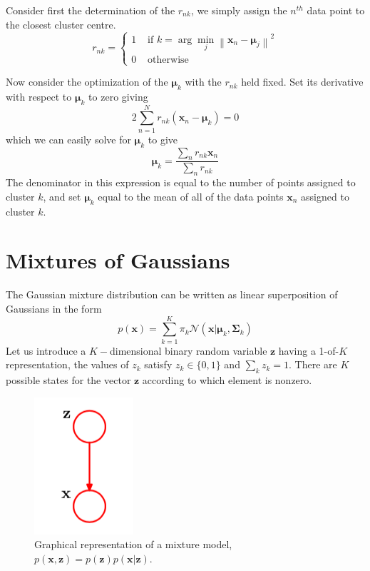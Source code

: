 \documentclass[5p,sort&compress]{elsarticle}
\begin{document}
Consider first the determination of the $r_{nk}$, we simply assign the $n^{th}$ data point to the closest cluster centre.
\begin{equation}
r_{n k}=\left\{\begin{array}{ll}{1} & {\text { if } k=\arg \min _{j}\left\|\mathbf{x}_{n}-\boldsymbol{\mu}_{j}\right\|^{2}} \\ {0} & {\text { otherwise }}\end{array}\right.
\end{equation}

Now consider the optimization of the $\boldsymbol{\mu}_k$ with the $r_{nk}$ held fixed. Set its derivative with respect to $\boldsymbol{\mu}_k$ to zero giving
\begin{equation}
2 \sum_{n=1}^{N} r_{n k}\left(\mathbf{x}_{n}-\boldsymbol{\mu}_{k}\right)=0
\end{equation}
which we can easily solve for $\boldsymbol{\mu}_k$ to give
\begin{equation}
\boldsymbol{\mu}_{k}=\frac{\sum_{n} r_{n k} \mathbf{x}_{n}}{\sum_{n} r_{n k}}
\end{equation}
The denominator in this expression is equal to the number of points assigned to cluster $k$, and set $\boldsymbol{\mu}_k$ equal to the mean of all of the data points $\mathbf{x}_n$ assigned to cluster $k$.



\section{Mixtures of Gaussians}

The Gaussian mixture distribution can be written as linear superposition of Gaussians in the form
\begin{equation}
p(\mathbf{x})=\sum_{k=1}^{K} \pi_{k} \mathcal{N}\left(\mathbf{x} | \boldsymbol{\mu}_{k}, \mathbf{\Sigma}_{k}\right)
\end{equation}
Let us introduce a $K-$dimensional binary random variable $\mathbf{z}$ having a 1-of-$K$ representation, the values of $z_k$ satisfy $z_k \in \{0,1\}$ and $\sum_k z_k = 1$. There are $K$ possible states for the vector $\mathbf{z}$ according to which element is nonzero.

\begin{figure}[ht]
     \centering
     \includegraphics[width = 0.3\linewidth]{figure/figure9_4.png}
     \caption{Graphical representation of a mixture model, $p(\mathbf{x}, \mathbf{z}) = p(\mathbf{z}) p(\mathbf{x}|\mathbf{z})$.}
     \label{fig:9_4}
\end{figure}
\end{document}

